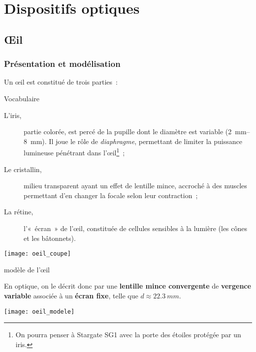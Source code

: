 \documentclass[../main/main.tex]{subfiles}
\begin{document}
\setcounter{chapter}{3}

\chapter{Dispositifs optiques}

\section{Œil}
\subsection{Présentation et modélisation}
Un œil est constitué de trois parties~:\smallbreak
\begin{tcbraster}[raster columns=2, raster equal height=rows]
    \begin{nota}[label=nota:oeilvoca]{Vocabulaire}
        \begin{description}
            \item[L'iris,] partie colorée, est percé de la pupille dont le diamètre est
                variable (\SIrange{2}{8}{mm}). Il joue le rôle de \textit{diaphragme},
                permettant de limiter la puissance lumineuse pénétrant dans
                l'œil\footnote{On pourra penser à Stargate SG1 avec la porte des étoiles
                protégée par un iris.}~;
            \item[Le cristallin,] milieu transparent ayant un effet de lentille mince,
                accroché à des muscles permettant d'en changer la focale selon leur
                contraction~;
            \item[La rétine,] l'«~écran~» de l'œil, constituée de cellules sensibles à
                la lumière (les cônes et les bâtonnets).
        \end{description}
        \begin{center}
            \texttt{[image: oeil\_coupe]}
            \label{fig:oeil_coupe}
        \end{center}
    \end{nota}
    \begin{defi}[label=def:oeil]{modèle de l'œil}

        En optique, on le décrit donc par une \textbf{lentille mince convergente} de
        \textbf{vergence variable} associée à un \textbf{écran fixe}, telle que $d
        \approx \SI{22.3}{mm}$.
        \tcblower
        \begin{center}
            \texttt{[image: oeil\_modele]}
            \label{fig:oeil_modele}
        \end{center}
    \end{defi}
\end{tcbraster}
\end{document}
